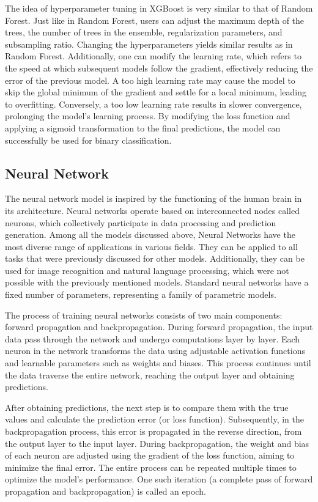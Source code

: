 The idea of hyperparameter tuning in XGBoost is very similar to that of Random Forest. Just like in Random Forest, users can adjust the maximum depth of the trees, the number of trees in the ensemble, regularization parameters, and subsampling ratio. Changing the hyperparameters yields similar results as in Random Forest. Additionally, one can modify the learning rate, which refers to the speed at which subsequent models follow the gradient, effectively reducing the error of the previous model. A too high learning rate may cause the model to skip the global minimum of the gradient and settle for a local minimum, leading to overfitting. Conversely, a too low learning rate results in slower convergence, prolonging the model's learning process. By modifying the loss function and applying a sigmoid transformation to the final predictions, the model can successfully be used for binary classification.

\subsection{Neural Network}
The neural network model is inspired by the functioning of the human brain in its architecture. Neural networks operate based on interconnected nodes called neurons, which collectively participate in data processing and prediction generation. Among all the models discussed above, Neural Networks have the most diverse range of applications in various fields. They can be applied to all tasks that were previously discussed for other models. Additionally, they can be used for image recognition and natural language processing, which were not possible with the previously mentioned models. Standard neural networks have a fixed number of parameters, representing a family of parametric models.

The process of training neural networks consists of two main components: forward propagation and backpropagation. During forward propagation, the input data pass through the network and undergo computations layer by layer. Each neuron in the network transforms the data using adjustable activation functions and learnable parameters such as weights and biases. This process continues until the data traverse the entire network, reaching the output layer and obtaining predictions.

After obtaining predictions, the next step is to compare them with the true values and calculate the prediction error (or loss function). Subsequently, in the backpropagation process, this error is propagated in the reverse direction, from the output layer to the input layer. During backpropagation, the weight and bias of each neuron are adjusted using the gradient of the loss function, aiming to minimize the final error. The entire process can be repeated multiple times to optimize the model's performance. One such iteration (a complete pass of forward propagation and backpropagation) is called an epoch.

